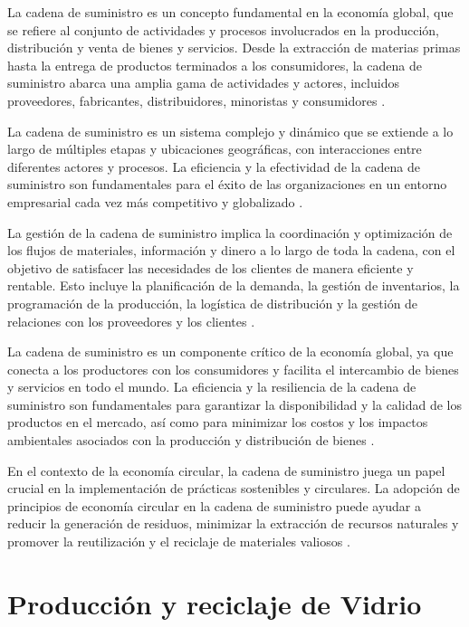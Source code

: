 \documentclass[main.tex]{subfiles}
\begin{document}
La cadena de suministro es un concepto fundamental en la economía global, que se refiere al conjunto de actividades y procesos involucrados en la producción, distribución y venta de bienes y servicios. Desde la extracción de materias primas hasta la entrega de productos terminados a los consumidores, la cadena de suministro abarca una amplia gama de actividades y actores, incluidos proveedores, fabricantes, distribuidores, minoristas y consumidores \cite{christopher2016logistics}.

La cadena de suministro es un sistema complejo y dinámico que se extiende a lo largo de múltiples etapas y ubicaciones geográficas, con interacciones entre diferentes actores y procesos. La eficiencia y la efectividad de la cadena de suministro son fundamentales para el éxito de las organizaciones en un entorno empresarial cada vez más competitivo y globalizado \cite{christopher2016logistics}.

La gestión de la cadena de suministro implica la coordinación y optimización de los flujos de materiales, información y dinero a lo largo de toda la cadena, con el objetivo de satisfacer las necesidades de los clientes de manera eficiente y rentable. Esto incluye la planificación de la demanda, la gestión de inventarios, la programación de la producción, la logística de distribución y la gestión de relaciones con los proveedores y los clientes \cite{christopher2016logistics}.

La cadena de suministro es un componente crítico de la economía global, ya que conecta a los productores con los consumidores y facilita el intercambio de bienes y servicios en todo el mundo. La eficiencia y la resiliencia de la cadena de suministro son fundamentales para garantizar la disponibilidad y la calidad de los productos en el mercado, así como para minimizar los costos y los impactos ambientales asociados con la producción y distribución de bienes \cite{christopher2016logistics}.

En el contexto de la economía circular, la cadena de suministro juega un papel crucial en la implementación de prácticas sostenibles y circulares. La adopción de principios de economía circular en la cadena de suministro puede ayudar a reducir la generación de residuos, minimizar la extracción de recursos naturales y promover la reutilización y el reciclaje de materiales valiosos \cite{melendez2021economia}.

\section{Producción y reciclaje de Vidrio}
\end{document}
